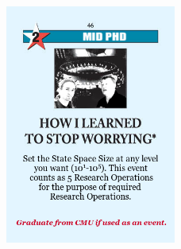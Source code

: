 \documentclass[12pt]{cmuthesis}
\begin{document}
\newpage
\begin{figure}[h]
	\vspace{12em}
	\begin{center}
		\includegraphics[width=0.5\textwidth]{how-i-learned.png}
	\end{center}
\end{figure}


\tableofcontents
\listoffigures
\listoftables

\mainmatter


%
%
%
%
%

\newcommand{\inspirationallinebreak}{\vspace{0.25em}}
\newcommand\inspirationalquote[2]{\begin{flushright}
	\vspace{-1em}
	\fontfamily{pzc}\selectfont
	{\em #1}
	\inspirationallinebreak

	---{#2}
	\fontfamily{mdbch}\selectfont
	\vspace{2em}
\end{flushright}}
\end{document}
